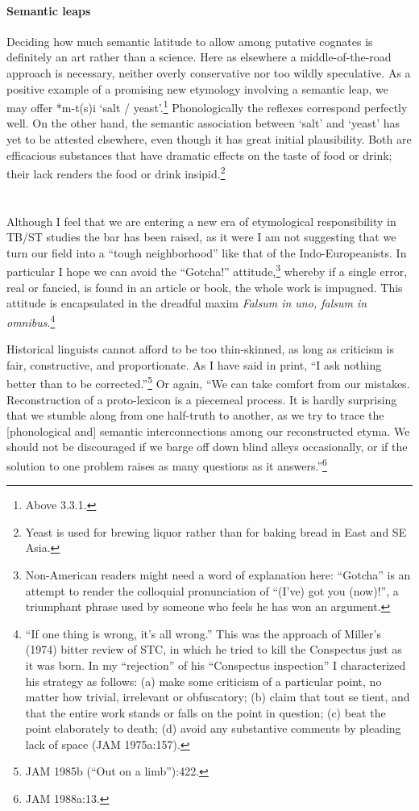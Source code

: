 \paragraph{Semantic leaps}
Deciding how much semantic latitude to allow among putative cognates is definitely an art rather than a science. Here as elsewhere a middle-of-the-road approach is necessary, neither overly conservative nor too wildly speculative. As a positive example of a promising new etymology involving a semantic leap, we may offer *m-t(s)i `salt / yeast'.\footnote{Above 3.3.1.} Phonologically the reflexes correspond perfectly well. On the other hand, the semantic association between `salt' and `yeast' has yet to be attested elsewhere, even though it has great initial plausibility. Both are efficacious substances that have dramatic effects on the taste of food or drink; their lack renders the food or drink insipid.\footnote{Yeast is used for brewing liquor rather than for baking bread in East and SE Asia.}

\section*{}
Although I feel that we are entering a new era of etymological responsibility in TB/ST studies  the bar has been raised, as it were  I am not suggesting that we turn our field into a ``tough neighborhood'' like that of the Indo-Europeanists. In particular I hope we can avoid the ``Gotcha!'' attitude,\footnote{Non-American readers might need a word of explanation here: “Gotcha” is an attempt to render the colloquial pronunciation of “(I’ve) got you (now)!”, a triumphant phrase used by someone who feels he has won an argument.} whereby if a single error, real or fancied, is found in an article or book, the whole work is impugned. This attitude is encapsulated in the dreadful maxim {\it Falsum in uno, falsum in omnibus}.\footnote{ “If one thing is wrong, it’s all wrong.” This was the approach of Miller’s (1974) bitter review of STC, in which he tried to kill the Conspectus just as it was born. In my “rejection” of his “Conspectus inspection” I characterized his strategy as follows: (a) make some criticism of a particular point, no matter how trivial, irrelevant or obfuscatory; (b) claim that tout se tient, and that the entire work stands or falls on the point in question; (c) beat the point elaborately to death; (d) avoid any substantive comments by pleading lack of space (JAM 1975a:157).}

Historical linguists cannot afford to be too thin-skinned, as long as criticism is fair, constructive, and proportionate. As I have said in print, ``I ask nothing better than to be corrected.''\footnote{JAM 1985b (“Out on a limb”):422.} Or again, ``We can take comfort from our mistakes. Reconstruction of a proto-lexicon is a piecemeal process. It is hardly surprising that we stumble along from one half-truth to another, as we try to trace the [phonological and] semantic interconnections among our reconstructed etyma. We should not be discouraged if we barge off down blind alleys occasionally, or if the solution to one problem raises as many questions as it answers.''\footnote{JAM 1988a:13.}

